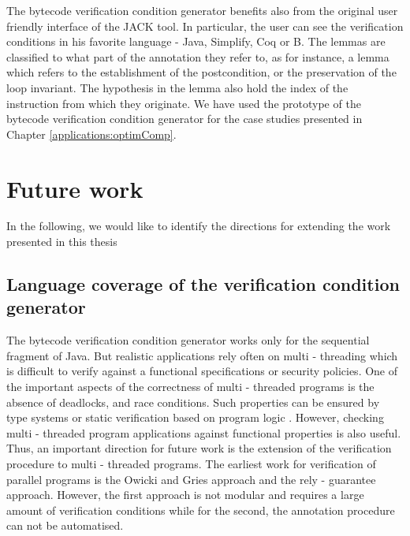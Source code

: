 The bytecode verification condition generator benefits also from the original user friendly interface of the JACK tool.  In particular, 
the user can see the verification conditions in his favorite language - Java, Simplify, Coq or B. The lemmas are classified 
to what part of the annotation they refer to, as for instance, a lemma which refers to the establishment of the postcondition, or the preservation of the loop invariant.
The hypothesis in the lemma also hold the index of the instruction from which they originate. 
We have used the prototype of the bytecode verification condition generator for the case studies presented in Chapter \ref{applications:optimComp}.


\section{Future work}
In the following, we would like to identify the directions for extending the work presented in this thesis

\subsection{Language coverage of the verification condition generator}
The bytecode verification condition generator works only for the sequential fragment of Java. But realistic applications 
rely often on multi - threading which is difficult to verify against a functional specifications or security policies.
One of the important aspects of the correctness of multi - threaded programs is the absence of deadlocks, 
and race conditions. Such properties can be ensured  by type systems \cite{FA99TSL,flanagan00typebased} or static verification based on program logic \cite{FLL02ESC}.  
  However, checking multi - threaded
 program applications against functional properties is also  useful. 
 Thus, an important direction for future work is the extension of the verification procedure to multi - threaded programs.
The earliest work for  verification of  parallel programs is  the Owicki and Gries approach   
\cite{nipkow99owickigries}  and the rely - guarantee approach. However, 
the first approach is not modular and requires a large amount of verification conditions while for the second, the annotation procedure can not be automatised.

